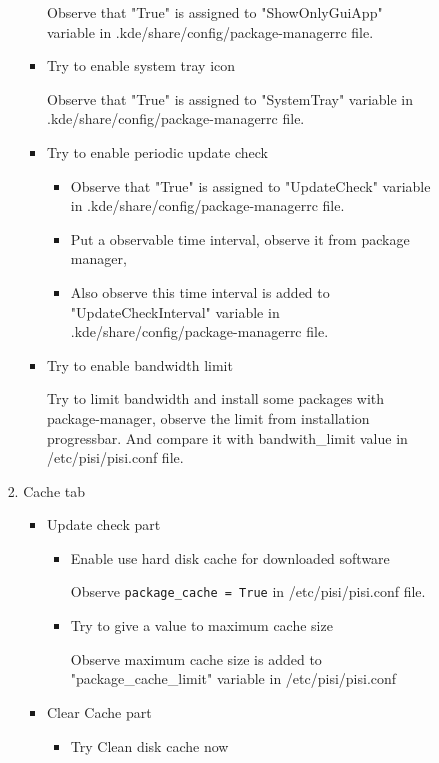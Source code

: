 \documentclass[a4paper,10pt]{article}
\begin{document}
\begin{enumerate}
\begin{enumerate}
\begin{enumerate}
\begin{enumerate}
\begin{itemize}
                    Observe that "True" is assigned to "ShowOnlyGuiApp" variable in .kde/share/config/package-managerrc file.

                    \item Try to enable system tray icon

                    Observe that "True" is assigned to "SystemTray" variable in .kde/share/config/package-managerrc file.

                    \item Try to enable periodic update check
                    \begin{itemize}
                        \item Observe that "True" is assigned to "UpdateCheck" variable in .kde/share/config/package-managerrc file.
                        \item Put a observable time interval, observe it from package manager,
                        \item Also observe this time interval is added to "UpdateCheckInterval" variable in .kde/share/config/package-managerrc file.
                    \end{itemize}

                    \item Try to enable bandwidth limit

                    Try to limit bandwidth and install some packages with package-manager, observe the limit from installation progressbar. And compare it with bandwith\_limit value in /etc/pisi/pisi.conf file.
                \end{itemize}
                \item Cache tab
                \begin{itemize}
                    \item Update check part
                    \begin{itemize}
                        \item Enable use hard disk cache for downloaded software

                        Observe \texttt{package\_cache = True} in /etc/pisi/pisi.conf file.

                        \item Try to give a value to maximum cache size

                        Observe maximum cache size is added to "package\_cache\_limit" variable in /etc/pisi/pisi.conf
                    \end{itemize}
                    \item Clear Cache part
                    \begin{itemize}
                        \item Try Clean disk cache now


\end{itemize}
\end{itemize}
\end{enumerate}
\end{enumerate}
\end{enumerate}
\end{enumerate}
\end{document}
